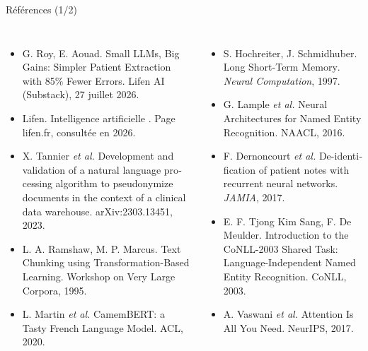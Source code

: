 \documentclass[11pt,aspectratio=169]{beamer}
\newcommand{\en}[1]{\foreignlanguage{english}{#1}}
\begin{document}
\begin{frame}[t]{Références (1/2)}
  \scriptsize
  \begin{columns}[T]
    \begin{itemize}
      \item[{[1]}] G. Roy, E. Aouad. \og \en{Small LLMs, Big Gains: Simpler Patient
        Extraction with 85\% Fewer Errors}\fg. Lifen AI (Substack), 27 juillet 2026.
      \item[{[2]}] Lifen. \og Intelligence artificielle \fg. Page lifen.fr, consultée en 2026.
      \item[{[3]}] X. Tannier \textit{et al.} \og \en{Development and validation of a natural
        language processing algorithm to pseudonymize documents in the context of a
        clinical data warehouse}\fg. \en{arXiv:2303.13451}, 2023.
      \item[{[4]}] L. A. Ramshaw, M. P. Marcus. \og \en{Text Chunking using
        Transformation-Based Learning}\fg. \en{Workshop on Very Large Corpora}, 1995.
      \item[{[5]}] L. Martin \textit{et al.} \og \en{CamemBERT: a Tasty French Language
        Model}\fg. ACL, 2020.
    \end{itemize}
    \begin{itemize}
      \item[{[6]}] S. Hochreiter, J. Schmidhuber. \og \en{Long Short-Term Memory}\fg.
        \textit{Neural Computation}, 1997.
      \item[{[7]}] G. Lample \textit{et al.} \og \en{Neural Architectures for Named Entity
        Recognition}\fg. NAACL, 2016.
      \item[{[8]}] F. Dernoncourt \textit{et al.} \og \en{De-identification of patient notes
        with recurrent neural networks}\fg. \textit{JAMIA}, 2017.
      \item[{[9]}] E. F. Tjong Kim Sang, F. De Meulder. \og \en{Introduction to the CoNLL-2003
        Shared Task: Language-Independent Named Entity Recognition}\fg. CoNLL, 2003.
      \item[{[10]}] A. Vaswani \textit{et al.} \og \en{Attention Is All You Need}\fg.
        NeurIPS, 2017.
    \end{itemize}
  \end{columns}
\end{frame}
\end{document}
